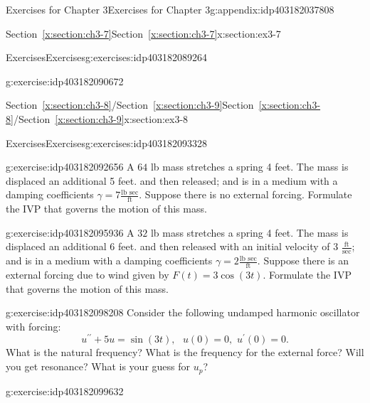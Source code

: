 \documentclass[oneside,10pt,]{book}
\newcommand{\xreffont}{\relax}
\numberwithin{equation}{section}
\numberwithin{equation}{section}
\begin{document}
\begin{appendixptx}{Exercises for Chapter 3}{}{Exercises for Chapter 3}{}{}{g:appendix:idp403182037808}
\begin{sectionptx}{Section~{\xreffont\ref*{x:section:ch3-7}}}{}{Section~{\xreffont\ref*{x:section:ch3-7}}}{}{}{x:section:ex3-7}
\begin{exercises-subsection-numberless}{Exercises}{}{Exercises}{}{}{g:exercises:idp403182089264}
\begin{divisionexercise}{4}{}{}{g:exercise:idp403182090672}
\end{divisionexercise}%
\end{exercises-subsection-numberless}
\end{sectionptx}
%
%
\typeout{************************************************}
\typeout{Section D.7 Section~{\xreffont\ref*{x:section:ch3-8}}\slash{}Section~{\xreffont\ref*{x:section:ch3-9}}}
\typeout{************************************************}
%
\begin{sectionptx}{Section~{\xreffont\ref*{x:section:ch3-8}}\slash{}Section~{\xreffont\ref*{x:section:ch3-9}}}{}{Section~{\xreffont\ref*{x:section:ch3-8}}\slash{}Section~{\xreffont\ref*{x:section:ch3-9}}}{}{}{x:section:ex3-8}
%
%
\typeout{************************************************}
\typeout{************************************************}
%
\begin{exercises-subsection-numberless}{Exercises}{}{Exercises}{}{}{g:exercises:idp403182093328}
\begin{divisionexercise}{1}{}{}{g:exercise:idp403182092656}%
A \(64\) lb mass stretches a spring 4 feet. The mass is displaced an additional 5 feet. and then released; and is in a medium with a damping coefficients \(\gamma=7\frac{\text{lb sec}}{\text{ft}}\). Suppose there is no external forcing. Formulate the IVP that governs the motion of this mass.%
\end{divisionexercise}%
\begin{divisionexercise}{2}{}{}{g:exercise:idp403182095936}%
A \(32\) lb mass stretches a spring 4 feet. The mass is displaced an additional 6 feet. and then released with an initial velocity of 3 \(\frac{\text{ft}}{\text{sec}}\); and is in a medium with a damping coefficients \(\gamma=2\frac{\text{lb sec}}{\text{ft}}\). Suppose there is an external forcing due to wind given by \(F(t)=3\cos\left(3t\right)\). Formulate the IVP that governs the motion of this mass.%
\end{divisionexercise}%
\begin{divisionexercise}{3}{}{}{g:exercise:idp403182098208}%
Consider the following undamped harmonic oscillator with forcing:%
\begin{equation*}
u^{\prime\prime}+5u=\sin\left(3t\right),\,\,\,\,u(0)=0,\,\,u^{\prime}(0)=0.
\end{equation*}
What is the natural frequency? What is the frequency for the external force? Will you get resonance? What is your guess for \(u_{p}\)?%
\end{divisionexercise}%
\begin{divisionexercise}{4}{}{}{g:exercise:idp403182099632}%

\end{divisionexercise}
\end{exercises-subsection-numberless}
\end{sectionptx}
\end{appendixptx}
\end{document}
